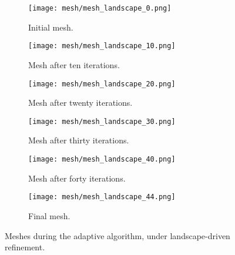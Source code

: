 \begin{figure}[htbp]
    \begin{subfigure}[t]{0.49\textwidth}
        \centering
        \texttt{[image: mesh/mesh\_landscape\_0.png]}
        \caption{Initial mesh.}
        \label{fig:mesh_0}
    \end{subfigure}
    \begin{subfigure}[t]{0.49\textwidth}
        \centering
        \texttt{[image: mesh/mesh\_landscape\_10.png]}
        \caption{Mesh after ten iterations.}
        \label{fig:mesh_10}
    \end{subfigure}
    \vspace{1cm}
    \begin{subfigure}[t]{0.49\textwidth}
        \centering
        \texttt{[image: mesh/mesh\_landscape\_20.png]}
        \caption{Mesh after twenty iterations.}
        \label{fig:mesh_20}
    \end{subfigure}
    \begin{subfigure}[t]{0.49\textwidth}
        \centering
        \texttt{[image: mesh/mesh\_landscape\_30.png]}
        \caption{Mesh after thirty iterations.}
        \label{fig:mesh_30}
    \end{subfigure}
    \vspace{1cm}
    \begin{subfigure}[t]{0.49\textwidth}
        \centering
        \texttt{[image: mesh/mesh\_landscape\_40.png]}
        \caption{Mesh after forty iterations.}
        \label{fig:mesh_40}
    \end{subfigure}
    \begin{subfigure}[t]{0.49\textwidth}
        \centering
        \texttt{[image: mesh/mesh\_landscape\_44.png]}
        \caption{Final mesh.}
        \label{fig:mesh_50}
    \end{subfigure}
    \caption{Meshes during the adaptive algorithm, under landscape-driven refinement.}
\end{figure}


